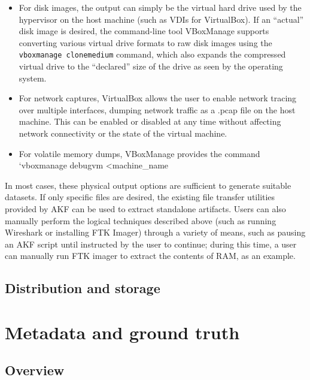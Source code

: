 \documentclass[letterpaper,12pt]{report}
\def\tightlist{}
\newcommand{\passthrough}[1]{#1}
\begin{document}
\begin{itemize}
\tightlist
\item
  For disk images, the output can simply be the virtual hard drive used
  by the hypervisor on the host machine (such as VDIs for VirtualBox).
  If an ``actual'' disk image is desired, the command-line tool
  VBoxManage supports converting various virtual drive formats to raw
  disk images using the \passthrough{\lstinline!vboxmanage clonemedium!}
  command, which also expands the compressed virtual drive to the
  ``declared'' size of the drive as seen by the operating system.\\
\item
  For network captures, VirtualBox allows the user to enable network
  tracing over multiple interfaces, dumping network traffic as a .pcap
  file on the host machine. This can be enabled or disabled at any time
  without affecting network connectivity or the state of the virtual
  machine.\\
\item
  For volatile memory dumps, VBoxManage provides the command `vboxmanage
  debugvm \textless machine\_name
\end{itemize}

In most cases, these physical output options are sufficient to generate
suitable datasets. If only specific files are desired, the existing file
transfer utilities provided by AKF can be used to extract standalone
artifacts. Users can also manually perform the logical techniques
described above (such as running Wireshark or installing FTK Imager)
through a variety of means, such as pausing an AKF script until
instructed by the user to continue; during this time, a user can
manually run FTK imager to extract the contents of RAM, as an example.

\subsection{Distribution and
storage}\label{distribution-and-storage}

\section{Metadata and ground
truth}\label{metadata-and-ground-truth}

\subsection{Overview}\label{overview-1}
\end{document}
